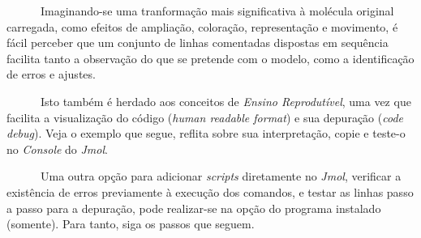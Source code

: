 \documentclass[
  letterpaper,
  DIV=11,
  numbers=noendperiod]{scrreprt}
\newenvironment{Shaded}{\begin{snugshade}}{\end{snugshade}}
\newcommand{\CommentTok}[1]{\textcolor[rgb]{0.37,0.37,0.37}{#1}}
\newcommand{\DecValTok}[1]{\textcolor[rgb]{0.68,0.00,0.00}{#1}}
\newcommand{\FloatTok}[1]{\textcolor[rgb]{0.68,0.00,0.00}{#1}}
\newcommand{\NormalTok}[1]{\textcolor[rgb]{0.00,0.23,0.31}{#1}}
\newcommand{\SpecialCharTok}[1]{\textcolor[rgb]{0.37,0.37,0.37}{#1}}
\begin{document}
~~~~~~Imaginando-se uma tranformação mais significativa à molécula
original carregada, como efeitos de ampliação, coloração, representação
e movimento, é fácil perceber que um conjunto de linhas comentadas
dispostas em sequência facilita tanto a observação do que se pretende
com o modelo, como a identificação de erros e ajustes.

~~~~~~Isto também é herdado aos conceitos de \emph{Ensino Reprodutível},
uma vez que facilita a visualização do código (\emph{human readable
format}) e sua depuração (\emph{code debug}). Veja o exemplo que segue,
reflita sobre sua interpretação, copie e teste-o no \emph{Console} do
\emph{Jmol}.

\begin{Shaded}
\end{Shaded}

~~~~~~Uma outra opção para adicionar \emph{scripts} diretamente no
\emph{Jmol}, verificar a existência de erros previamente à execução dos
comandos, e testar as linhas passo a passo para a depuração, pode
realizar-se na opção do programa instalado (somente). Para tanto, siga
os passos que seguem.
\end{document}
